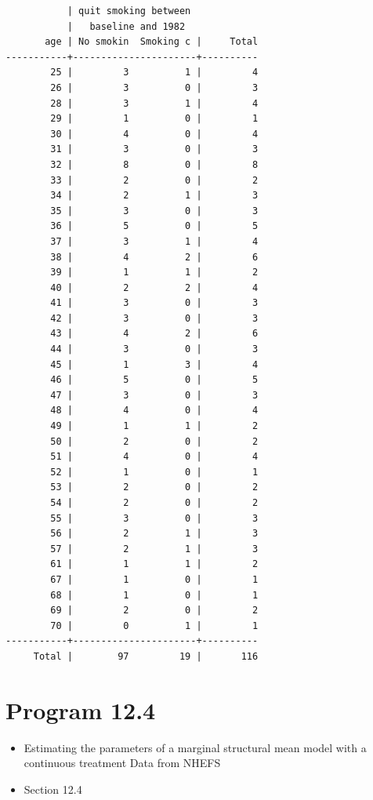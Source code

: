 \documentclass[
  10pt,
  a4paper,
]{book}
\providecommand{\tightlist}{%
  \setlength{\itemsep}{0pt}\setlength{\parskip}{0pt}}
\begin{document}
\begin{verbatim}
           | quit smoking between
           |   baseline and 1982
       age | No smokin  Smoking c |     Total
-----------+----------------------+----------
        25 |         3          1 |         4 
        26 |         3          0 |         3 
        28 |         3          1 |         4 
        29 |         1          0 |         1 
        30 |         4          0 |         4 
        31 |         3          0 |         3 
        32 |         8          0 |         8 
        33 |         2          0 |         2 
        34 |         2          1 |         3 
        35 |         3          0 |         3 
        36 |         5          0 |         5 
        37 |         3          1 |         4 
        38 |         4          2 |         6 
        39 |         1          1 |         2 
        40 |         2          2 |         4 
        41 |         3          0 |         3 
        42 |         3          0 |         3 
        43 |         4          2 |         6 
        44 |         3          0 |         3 
        45 |         1          3 |         4 
        46 |         5          0 |         5 
        47 |         3          0 |         3 
        48 |         4          0 |         4 
        49 |         1          1 |         2 
        50 |         2          0 |         2 
        51 |         4          0 |         4 
        52 |         1          0 |         1 
        53 |         2          0 |         2 
        54 |         2          0 |         2 
        55 |         3          0 |         3 
        56 |         2          1 |         3 
        57 |         2          1 |         3 
        61 |         1          1 |         2 
        67 |         1          0 |         1 
        68 |         1          0 |         1 
        69 |         2          0 |         2 
        70 |         0          1 |         1 
-----------+----------------------+----------
     Total |        97         19 |       116 
\end{verbatim}

\section{Program 12.4}\label{program-12.4-1}

\begin{itemize}
\tightlist
\item
  Estimating the parameters of a marginal structural mean model with a continuous treatment Data from NHEFS
\item
  Section 12.4
\end{itemize}
\end{document}
